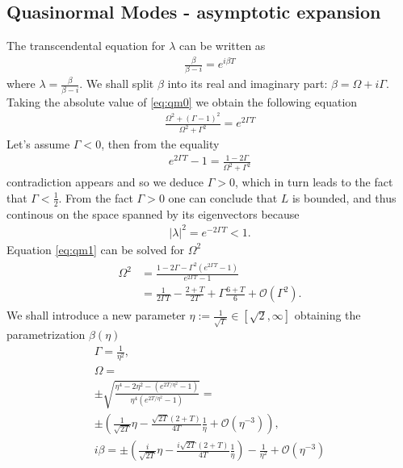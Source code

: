 \documentclass[
a4paper,%
10pt,%
titlepage,%
twoside%
]{article}
\begin{document}
\subsection{Quasinormal Modes - asymptotic expansion}
The transcendental equation for $\lambda$ can be written as
\begin{gather}\label{eq:qm0}
  \frac{\beta}{\beta-i}=e^{i\beta T}
\end{gather}
where $\lambda=\frac{\beta}{\beta-i}$. We shall split $\beta$ into its
real and imaginary part: $\beta=\Omega+i\Gamma$.  Taking the absolute
value of \eqref{eq:qm0} we obtain the following equation
\begin{gather}\label{eq:qm1}
  \frac{\Omega^2+(\Gamma-1)^2}{\Omega^2+\Gamma^2}=e^{2\Gamma T}
\end{gather}
Let's assume $\Gamma<0$, then from the equality
\begin{gather}
  e^{2\Gamma T}-1=\frac{1-2\Gamma}{\Omega^2+\Gamma^2}
\end{gather}
contradiction appears and so we deduce $\Gamma>0$, which in turn leads
to the fact that $\Gamma<\frac{1}{2}$. From the fact $\Gamma>0$ one
can conclude that $L$ is bounded, and thus continous on the space spanned
by its eigenvectors because
\begin{gather}
|\lambda|^2=e^{-2\Gamma T}<1.
\end{gather}
Equation
\eqref{eq:qm1} can be solved for $\Omega^2$
\begin{gather}
  \begin{split}
    \Omega^2&=\frac{1-2\Gamma-\Gamma^2(e^{2\Gamma T}-1)}{e^{2\Gamma T}-1}\\
    &=\frac{1}{2\Gamma T}-\frac{2+T}{2T}+\Gamma\frac{6+T}{6}+\mathcal{O}(\Gamma^2).
  \end{split}
\end{gather}
We shall introduce a new parameter $\eta:=\frac{1}{\sqrt{\Gamma}}\in[\sqrt{2},\infty]$ obtaining
the parametrization $\beta(\eta)$
\begin{gather}\label{eq:qmparam}
  \Gamma=\frac{1}{\eta^2},\\
  \Omega=\\
  \pm\sqrt{\frac{\eta^4-2\eta^2-(e^{2T/\eta^2}-1)}{\eta^4(e^{2T/\eta^2}-1)}}=\\
  \pm(\frac{1}{\sqrt{2 T}}\eta-\frac{\sqrt{2T}(2+T)}{4T}\frac{1}{\eta}+\mathcal{O}(\eta^{-3})),\\
  i\beta=\pm(\frac{i}{\sqrt{2 T}}\eta-\frac{i\sqrt{2T}(2+T)}{4T}\frac{1}{\eta})-\frac{1}{\eta^2}+\mathcal{O}(\eta^{-3})
\end{gather}
\end{document}
